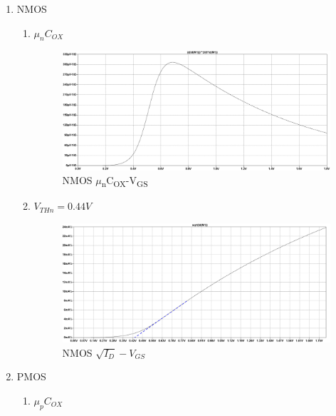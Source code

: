 \documentclass{article}
\begin{document}
\begin{enumerate}[(a)]
\begin{enumerate}[1.]
\item NMOS
\begin{enumerate}
\item \(\mu_{n}C_{OX}\)

\begin{figure}[H]
\centering
\includegraphics[width=.9\linewidth]{img/q3/b/nmos-ucox-vgs.pdf}
\caption{\label{fig:nmos-ucox-vgs}NMOS \(\mu\)\textsubscript{n}C\textsubscript{OX}-V\textsubscript{GS}}
\end{figure}
\item \(V_{THn} = 0.44V\)
\begin{figure}[H]
\centering
\includegraphics[width=.9\linewidth]{img/q3/b/nmos-sqrt-id-vgs.pdf}
\caption{\label{fig:nmos-sqrt-id-vgs}NMOS \(\sqrt{I_{D}}-V_{GS}\)}
\end{figure}
\end{enumerate}
\item PMOS
\begin{enumerate}
\item \(\mu_{p}C_{OX}\)


\end{enumerate}
\end{enumerate}
\end{enumerate}
\end{document}
